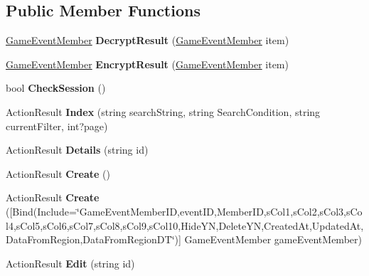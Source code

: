 \subsection*{Public Member Functions}
\begin{DoxyCompactItemize}
\item 
\hyperlink{a00081}{Game\+Event\+Member} {\bfseries Decrypt\+Result} (\hyperlink{a00081}{Game\+Event\+Member} item)\hypertarget{a00082_a16c0d6166a6c7e117e33552c6554b788}{}\label{a00082_a16c0d6166a6c7e117e33552c6554b788}

\item 
\hyperlink{a00081}{Game\+Event\+Member} {\bfseries Encrypt\+Result} (\hyperlink{a00081}{Game\+Event\+Member} item)\hypertarget{a00082_afca8ee60999f64ce5fb252d94188d96a}{}\label{a00082_afca8ee60999f64ce5fb252d94188d96a}

\item 
bool {\bfseries Check\+Session} ()\hypertarget{a00082_ae11b363756e47919d98bbb7270237637}{}\label{a00082_ae11b363756e47919d98bbb7270237637}

\item 
Action\+Result {\bfseries Index} (string search\+String, string Search\+Condition, string current\+Filter, int?page)\hypertarget{a00082_a25beb95f29cc0ae69ab4608d71947a0f}{}\label{a00082_a25beb95f29cc0ae69ab4608d71947a0f}

\item 
Action\+Result {\bfseries Details} (string id)\hypertarget{a00082_a3a566d0635dfd0094040629688d4ed87}{}\label{a00082_a3a566d0635dfd0094040629688d4ed87}

\item 
Action\+Result {\bfseries Create} ()\hypertarget{a00082_aaceedfa2ec280ae1a750661d391a7d41}{}\label{a00082_aaceedfa2ec280ae1a750661d391a7d41}

\item 
Action\+Result {\bfseries Create} (\mbox{[}Bind(Include=\char`\"{}Game\+Event\+Member\+ID,event\+ID,Member\+ID,s\+Col1,s\+Col2,s\+Col3,s\+Col4,s\+Col5,s\+Col6,s\+Col7,s\+Col8,s\+Col9,s\+Col10,Hide\+YN,Delete\+YN,Created\+At,Updated\+At,Data\+From\+Region,Data\+From\+Region\+DT\char`\"{})\mbox{]} Game\+Event\+Member game\+Event\+Member)\hypertarget{a00082_ad39bb341cb350076452413c443218774}{}\label{a00082_ad39bb341cb350076452413c443218774}

\item 
Action\+Result {\bfseries Edit} (string id)\hypertarget{a00082_a74688f8eb5e8b402269d1cbf74a262f7}{}\label{a00082_a74688f8eb5e8b402269d1cbf74a262f7}


\end{DoxyCompactItemize}
